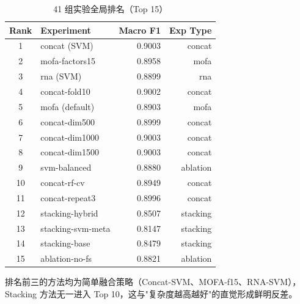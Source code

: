 \begin{table}[htbp]
\centering
\caption{41 组实验全局排名（Top 15）}
\label{tab:global_ranking}
\begin{tabular}{|clrr|}
\hline
\textbf{Rank} & \textbf{Experiment} & \textbf{Macro F1} & \textbf{Exp Type} \\
\hline
1 & concat (SVM) & 0.9003 & concat \\
2 & mofa-factors15 & 0.8958 & mofa \\
3 & rna (SVM) & 0.8899 & rna \\
4 & concat-fold10 & 0.9002 & concat \\
5 & mofa (default) & 0.8903 & mofa \\
6 & concat-dim500 & 0.8999 & concat \\
7 & concat-dim1000 & 0.9003 & concat \\
8 & concat-dim1500 & 0.9003 & concat \\
9 & svm-balanced & 0.8880 & ablation \\
10 & concat-rf-cv & 0.8949 & concat \\
11 & concat-repeat3 & 0.8996 & concat \\
12 & stacking-hybrid & 0.8507 & stacking \\
13 & stacking-svm-meta & 0.8147 & stacking \\
14 & stacking-base & 0.8479 & stacking \\
15 & ablation-no-fs & 0.8821 & ablation \\
\hline
\end{tabular}
\end{table}

排名前三的方法均为简单融合策略（Concat-SVM、MOFA-f15、RNA-SVM），Stacking 方法无一进入 Top 10，这与"复杂度越高越好"的直觉形成鲜明反差。
